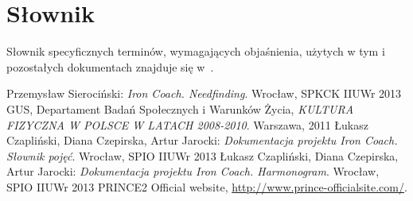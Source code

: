 \section{Słownik}
\noindent Słownik specyficznych terminów, wymagających objaśnienia, użytych w tym i pozostałych dokumentach znajduje się w~\cite{Sł}.
\begin{thebibliography}{99}
   Przemysław Sierociński: {\it Iron Coach. Needfinding}. Wrocław, SPKCK IIUWr 2013
   GUS, Departament Badań Społecznych i Warunków Życia, {\it KULTURA FIZYCZNA W POLSCE W LATACH 2008-2010}. Warszawa, 2011
   Łukasz Czapliński, Diana Czepirska, Artur Jarocki: {\it Dokumentacja projektu Iron Coach. Słownik pojęć}. Wrocław, SPIO IIUWr 2013
   Łukasz Czapliński, Diana Czepirska, Artur Jarocki: {\it Dokumentacja projektu Iron Coach. Harmonogram}. Wrocław, SPIO IIUWr 2013
   PRINCE2 Official website, \url{http://www.prince-officialsite.com/}.
\end{thebibliography}

